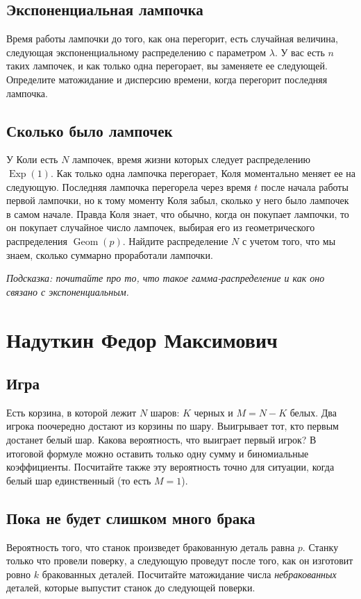 \documentclass[12pt]{article}
\DeclareMathOperator{\Geom}{Geom}
\DeclareMathOperator{\Exp}{Exp}
\begin{document}
\subsection{Экспоненциальная лампочка}
Время работы лампочки до того, как она перегорит, есть случайная величина, следующая экспоненциальному распределению с параметром $\lambda$. У вас есть $n$ таких лампочек, и как только одна перегорает, вы заменяете ее следующей. Определите матожидание и дисперсию времени, когда перегорит последняя лампочка.

\subsection{Сколько было лампочек}
У Коли есть $N$ лампочек, время жизни которых следует распределению $\Exp(1)$. Как только одна лампочка перегорает, Коля моментально меняет ее на следующую. Последняя лампочка перегорела через время $t$ после начала работы первой лампочки, но к тому моменту Коля забыл, сколько у него было лампочек в самом начале. Правда Коля знает, что обычно, когда он покупает лампочки, то он покупает случайное число лампочек, выбирая его из геометрического распределения $\Geom(p)$. Найдите распределение $N$ с учетом того, что мы знаем, сколько суммарно проработали лампочки. 

\emph{Подсказка: почитайте про то, что такое гамма-распределение и как оно связано с экспоненциальным.}

\newpage
\section{Надуткин Федор Максимович}

\subsection{Игра}
Есть корзина, в которой лежит $N$ шаров: $K$ черных и $M = N - K$ белых. Два игрока поочередно достают из корзины по шару. Выигрывает тот, кто первым достанет белый шар. Какова вероятность, что выиграет первый игрок? В итоговой формуле можно оставить только одну сумму и биномиальные коэффициенты. Посчитайте также эту вероятность точно для ситуации, когда белый шар единственный (то есть $M = 1$).

\subsection{Пока не будет слишком много брака}
Вероятность того, что станок произведет бракованную деталь равна $p$. Станку только что провели поверку, а следующую проведут после того, как он изготовит ровно $k$ бракованных деталей. Посчитайте матожидание числа \emph{небракованных} деталей, которые выпустит станок до следующей поверки.
\end{document}
